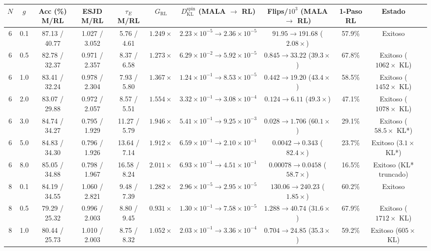 \documentclass[10pt,a4paper]{article}
\begin{document}
\begin{table}[H]
\centering
\begin{adjustbox}{max width=\textwidth}
\begin{tabular}{ccccccccccl}
\toprule
$N$ & $g$ & Acc (\%) M/RL & ESJD M/RL & $\tau_E$ M/RL & $G_{\mathrm{RL}}$ & $D_{\mathrm{KL}}^{\mathrm{spin}}$ (MALA $\to$ RL) & Flips/$10^3$ (MALA $\to$ RL) & 1-Paso RL & Estado \\
\midrule
6 & 0.1 & 87.13 / 40.77 & 1.027 / 3.052 & 5.76 / 4.61 & $1.249\times$ & $2.23\!\times\!10^{-5} \to 2.36\!\times\!10^{-5}$ & $91.95 \to 191.68$ ($2.08\times$) & 57.9\% & Exitoso \\
6 & 0.5 & 82.78 / 32.37 & 0.971 / 2.357 & 8.37 / 6.58 & $1.273\times$ & $6.29\!\times\!10^{-2} \to 5.92\!\times\!10^{-5}$ & $0.845 \to 33.22$ ($39.3\times$) & 67.8\% & Exitoso ($1062\times$ KL) \\
6 & 1.0 & 83.41 / 32.24 & 0.978 / 2.304 & 7.93 / 5.80 & $1.367\times$ & $1.24\!\times\!10^{-1} \to 8.53\!\times\!10^{-5}$ & $0.442 \to 19.20$ ($43.4\times$) & 58.5\% & Exitoso ($1452\times$ KL) \\
6 & 2.0 & 83.07 / 29.88 & 0.972 / 2.057 & 8.57 / 5.51 & $1.554\times$ & $3.32\!\times\!10^{-1} \to 3.08\!\times\!10^{-4}$ & $0.124 \to 6.11$ ($49.3\times$) & 47.1\% & Exitoso ($1078\times$ KL) \\
6 & 3.0 & 84.74 / 34.27 & 0.795 / 1.929 & 11.27 / 5.79 & $1.946\times$ & $5.41\!\times\!10^{-1} \to 9.25\!\times\!10^{-3}$ & $0.028 \to 1.706$ ($60.1\times$) & 29.1\% & Exitoso ($58.5\times$ KL*) \\
6 & 5.0 & 84.83 / 34.30 & 0.796 / 1.926 & 13.64 / 7.14 & $1.912\times$ & $6.59\!\times\!10^{-1} \to 2.10\!\times\!10^{-1}$ & $0.0042 \to 0.343$ ($82.4\times$) & 23.7\% & Exitoso ($3.1\times$ KL*) \\
6 & 8.0 & 85.05 / 34.88 & 0.798 / 1.967 & 16.58 / 8.24 & $2.011\times$ & $6.93\!\times\!10^{-1} \to 4.51\!\times\!10^{-1}$ & $0.00078 \to 0.0458$ ($58.7\times$) & 16.5\% & Exitoso (KL* truncado) \\
\midrule
8 & 0.1 & 84.19 / 34.55 & 1.060 / 2.821 & 9.48 / 7.39 & $1.282\times$ & $2.96\!\times\!10^{-5} \to 2.95\!\times\!10^{-5}$ & $130.06 \to 240.23$ ($1.85\times$) & 60.2\% & Exitoso \\
8 & 0.5 & 79.29 / 25.32 & 0.996 / 2.003 & 8.80 / 9.45 & $0.931\times$ & $1.30\!\times\!10^{-1} \to 7.58\!\times\!10^{-5}$ & $1.288 \to 40.74$ ($31.6\times$) & 67.9\% & Exitoso ($1712\times$ KL) \\
8 & 1.0 & 80.44 / 25.73 & 1.010 / 2.003 & 8.75 / 8.32 & $1.052\times$ & $2.03\!\times\!10^{-1} \to 3.36\!\times\!10^{-4}$ & $0.704 \to 24.85$ ($35.3\times$) & 59.2\% & Exitoso ($605\times$ KL) \\

\end{tabular}
\end{adjustbox}
\end{table}
\end{document}
